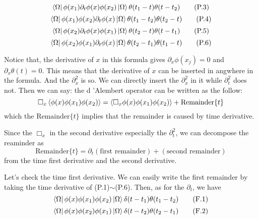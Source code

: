\documentclass[12pt,openany]{book}
\begin{document}
	\begin{equation}
		\bra{\Omega}\phi(x_1)\partial_t\phi(x)\phi(x_2)\ket{\Omega}\theta(t_1-t)\theta(t-t_2) \tag{P.3}
	\end{equation}
	\begin{equation}
		\bra{\Omega}\phi(x_1)\phi(x_2)\partial_t\phi(x)\ket{\Omega}\theta(t_1-t_2)\theta(t_2-t)	\tag{P.4}
	\end{equation}
	\begin{equation}
		\bra{\Omega}\phi(x_2)\partial_t\phi(x)\phi(x_1)\ket{\Omega}\theta(t_2-t)\theta(t-t_1) \tag{P.5}
	\end{equation}
	\begin{equation}
		\bra{\Omega}\phi(x_2)\phi(x_1)\partial_t\phi(x)\ket{\Omega}\theta(t_2-t_1)\theta(t_1-t) \tag{P.6}
	\end{equation}\par 
	Notice that, the derivative of $x$ in this formula gives $\partial_x\phi(x_j)=0$ and $\partial_x\theta(t)=0$. This means that the derivative of $x$ can be inserted in angwhere 
	in the formula. And the $\partial_x^2$ is so. We can directly insert the $\partial_x^2$ in it while $\partial_t^2$ does not. Then we can say: the d 'Alembert operator can be written as
	the follow:
	\begin{equation}
		\Box_x\braket{\phi(x)\phi(x_1)\phi(x_2)}=\braket{\Box_x\phi(x)\phi(x_1)\phi(x_2)}+\text{Remainder}\{t\}
	\end{equation} 
	which the $\text{Remainder}\{t\}$ implies that the remainder is caused by time derivative. 
    \par 
    Since the $\Box_x$ in the second derivative especially the $\partial_t^2$, we can decompose the reaminder as 
    \begin{equation}
    	\text{Remainder}\{t\}=\partial_t\left(\text{first remainder}\right)+\left(\text{second remainder}\right)
    \end{equation}
	from the time first derivative and the second derivative.
	\par 
	Let's check the time first derivative. We can easily write the first remainder by taking the time derivative of (P.1)$\sim$(P.6). 
	Then, as for the $\partial_t$, we have
	\begin{equation}
		\bra{\Omega}\phi(x)\phi(x_1)\phi(x_2)\ket{\Omega}\delta(t-t_1)\theta(t_1-t_2) \tag{F.1}
	\end{equation}
	\begin{equation}
		\bra{\Omega}\phi(x)\phi(x_2)\phi(x_1)\ket{\Omega}\delta(t-t_2)\theta(t_2-t_1) \tag{F.2}
	\end{equation}
\end{document}

